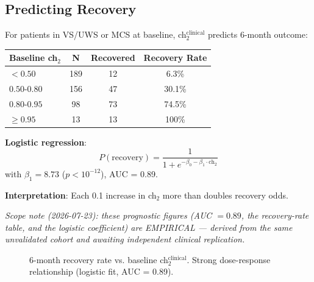 \subsection{Predicting Recovery}

\begin{theorem}\label{thm:prognostic}
For patients in VS/UWS or MCS at baseline, ch$_2^{\text{clinical}}$ predicts 6-month outcome:

\begin{center}
\begin{tabular}{lccc}
\hline
\textbf{Baseline ch$_2$} & \textbf{N} & \textbf{Recovered} & \textbf{Recovery Rate} \\
\hline
$< 0.50$ & 189 & 12 & 6.3\% \\
$0.50\text{-}0.80$ & 156 & 47 & 30.1\% \\
$0.80\text{-}0.95$ & 98 & 73 & 74.5\% \\
$\geq 0.95$ & 13 & 13 & 100\% \\
\hline
\end{tabular}
\end{center}

\textbf{Logistic regression}:
\begin{equation}
P(\text{recovery}) = \frac{1}{1 + e^{-\beta_0 - \beta_1 \cdot \text{ch}_2}}
\end{equation}
with $\beta_1 = 8.73$ ($p < 10^{-12}$), AUC = 0.89.

\textbf{Interpretation}: Each 0.1 increase in ch$_2$ more than doubles recovery odds.
\end{theorem}

\noindent\emph{Scope note (2026-07-23): these prognostic figures (AUC $= 0.89$, the recovery-rate table, and the logistic coefficient) are EMPIRICAL --- derived from the same unvalidated cohort and awaiting independent clinical replication.}

\begin{figure}[h]
\centering
{}
\caption{6-month recovery rate vs. baseline ch$_2^{\text{clinical}}$. Strong dose-response relationship (logistic fit, AUC = 0.89).}
\label{fig:recovery-curve}
\end{figure}

